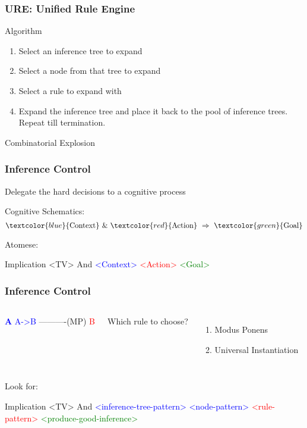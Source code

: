 \documentclass{beamer}
\begin{document}
\begin{frame}
  \frametitle{URE: Unified Rule Engine}

  Algorithm
  \begin{enumerate}
  \item \alert{Select an inference tree} to expand
  \item \alert{Select a node} from that tree to expand
  \item \alert{Select a rule} to expand with
  \item Expand the inference tree and place it back to the pool of
    inference trees. Repeat till termination.
  \end{enumerate}

  \begin{center}
    \alert{Combinatorial Explosion}
  \end{center}
  
\end{frame}
  
\begin{frame}[fragile]
  \frametitle{Inference Control}

  \begin{center}
    Delegate the hard decisions to a \alert{cognitive process}
  \end{center}

  Cognitive Schematics:
  $$\textcolor{blue}{\text{Context}}\ \&\ \textcolor{red}{\text{Action}}\ \Rightarrow\ \textcolor{green}{\text{Goal}}$$

  {\small
Atomese:
\begin{semiverbatim}
Implication <TV>
  And
    \textcolor{blue}{<Context>}
    \textcolor{red}{<Action>}
  \textcolor{green}{<Goal>}
\end{semiverbatim}
}

\end{frame}

\begin{frame}[fragile]
  \frametitle{Inference Control}

  \begin{columns}
    \column{0.4in}
{\tiny \begin{semiverbatim}






\textcolor{blue}{{\bf A}  A->B}
----------(MP)      
   \textcolor{red}{B}




\end{semiverbatim}}
\column{2in}
Which rule to choose?
\begin{enumerate}
\item Modus Ponens
\item Universal Instantiation
\end{enumerate}
\end{columns}

Look for:
{\small
\begin{semiverbatim}
Implication <TV>
  And
    \textcolor{blue}{<inference-tree-pattern>
    <node-pattern>}
    \textcolor{red}{<rule-pattern>}
  \textcolor{green}{<produce-good-inference>}
\end{semiverbatim}
}

\end{frame}
\end{document}
